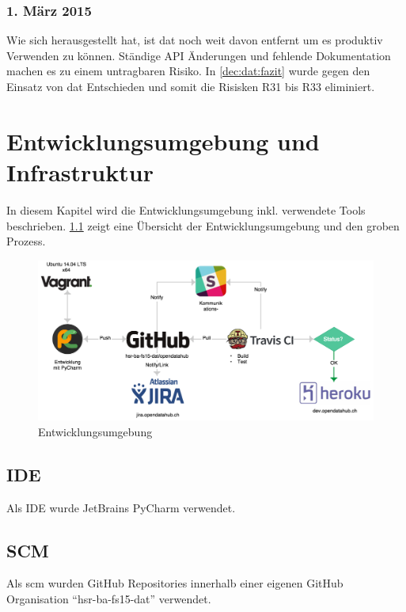\subsection{1. März 2015}

Wie sich herausgestellt hat, ist \gls{dat} noch weit davon entfernt um es produktiv Verwenden zu können. Ständige API Änderungen und fehlende Dokumentation machen es zu einem untragbaren Risiko. In \vref{dec:dat:fazit} wurde gegen den Einsatz von \gls{dat} Entschieden und somit die Risisken R31 bis R33 eliminiert.



\chapter{Entwicklungsumgebung und Infrastruktur}
In diesem Kapitel wird die Entwicklungsumgebung inkl. verwendete Tools beschrieben. \cref{fig:pm:entwicklungsumgebung} zeigt eine Übersicht der Entwicklungsumgebung und den groben Prozess.

\begin{figure}[H]
	\centering
	\includegraphics[width=\linewidth]{fig/entwicklungsumgebung}
	\caption{Entwicklungsumgebung}
	\label{fig:pm:entwicklungsumgebung}
\end{figure}

\section{IDE}
Als IDE wurde JetBrains PyCharm verwendet.

\section{SCM}
Als \gls{scm} wurden GitHub Repositories innerhalb einer eigenen GitHub Organisation ``hsr-ba-fs15-dat'' verwendet.


